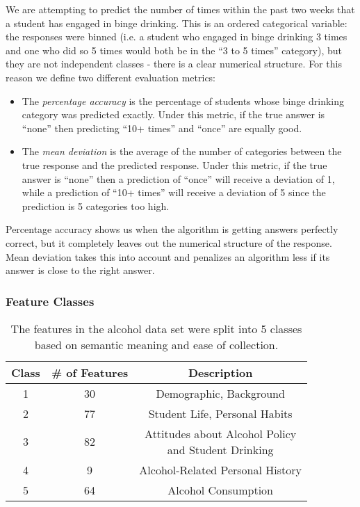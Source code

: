 We are attempting to predict the number of times within the past two weeks that a student has engaged in binge drinking.  This is an ordered categorical variable: the responses were binned (i.e. a student who engaged in binge drinking 3 times and one who did so 5 times would both be in the ``3 to 5 times'' category), but they are not independent classes - there is a clear numerical structure.  For this reason we define two different evaluation metrics:

\begin{itemize}
\item The \emph{percentage accuracy} is the percentage of students whose binge drinking category was predicted exactly.  Under this metric, if the true answer is ``none'' then predicting ``10+ times'' and ``once'' are equally good.
\item The \emph{mean deviation} is the average of the number of categories between the true response and the predicted response. Under this metric, if the true answer is ``none'' then a prediction of ``once'' will receive a deviation of 1, while a prediction of ``10+ times'' will receive a deviation of 5 since the prediction is 5 categories too high.
\end{itemize}

Percentage accuracy shows us when the algorithm is getting answers perfectly correct, but it completely leaves out the numerical structure of the response.  Mean deviation takes this into account and penalizes an algorithm less if its answer is close to the right answer.

\subsubsection{Feature Classes}

\begin{table}[t]
\centering
\begin{tabular}{|c|c|c|}
\hline
Class & \# of Features & Description \\ \hline
1 & 30 & Demographic, Background \\ \hline
2 & 77 & Student Life, Personal Habits \\ \hline
3 & 82 & \pbox{20cm}{Attitudes about Alcohol Policy \\ \centering and Student Drinking} \\ \hline
4 & 9 & Alcohol-Related Personal History \\ \hline
5 & 64 & Alcohol Consumption \\ \hline
\end{tabular}
\caption{The features in the alcohol data set were split into 5 classes based on semantic meaning and ease of collection.}
\label{Classes}
\end{table}


